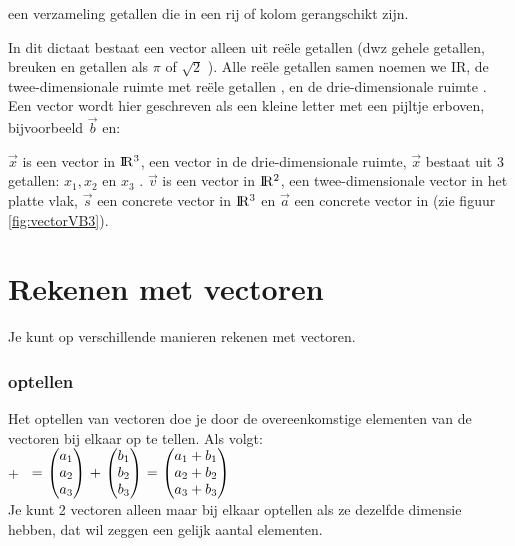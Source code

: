  {een verzameling getallen die in een rij of kolom gerangschikt zijn.}

In dit dictaat bestaat een vector alleen uit reële getallen (dwz gehele getallen, breuken en getallen als $  \pi $ of $ \sqrt{2} $ ). Alle reële getallen samen noemen we \rm I\!R, de twee-dimensionale ruimte met reële getallen \RT, en de drie-dimensionale ruimte \RD.
Een vector wordt hier geschreven als een kleine letter met een pijltje erboven, bijvoorbeeld $\vec{b}$ en: \\


$\vec{x}$ is een  vector in ${\rm I\!R^{3}}$,  een  vector in de drie-dimensionale ruimte, $ \vec{x} $  bestaat uit 3 getallen: $  x_{1},  x_{2} $  en  $ x_{3}$ .  $\vec{v}$  is een  vector in ${\rm I\!R^{2}}$, een twee-dimensionale vector in het platte vlak, $\vec{s}$ een concrete vector in  ${\rm I\!R^{3}}$ en $ \vec{a}  $ een concrete vector in \RT (zie figuur  \ref{fig:vectorVB3}).



\section{Rekenen met vectoren}
Je kunt op verschillende manieren rekenen met vectoren.
\subsubsection{optellen}
Het optellen van vectoren doe je door de overeenkomstige elementen van de vectoren bij elkaar op te tellen. Als volgt:\\

{  +   \  $ = \  \vecdriesnel {a}  \  +  \  \vecdriesnel {b} \   = \  \vecdrie {a_1+b_1}  {a_2+b_2}  {a_3+b_3}  $ \\
	Je kunt 2 vectoren alleen maar bij elkaar optellen als ze dezelfde dimensie hebben, dat wil zeggen een gelijk aantal elementen.} \\ 

